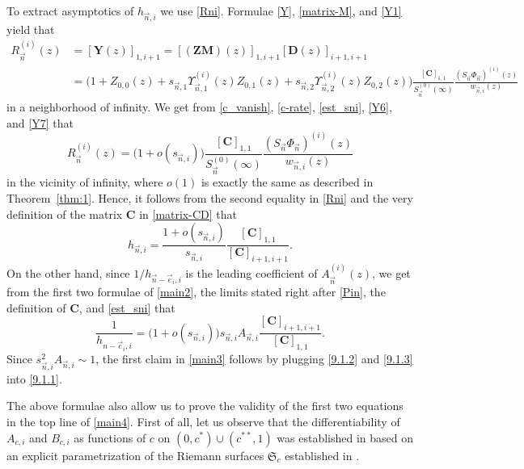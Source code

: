 \documentclass[10pt,a4paper]{amsart}
\numberwithin{equation}{section}
\newcommand{\n}{{\vec n}}
\newcommand{\RS}{\boldsymbol{\mathfrak{S}}}
\begin{document}
To extract asymptotics of $ h_{\n,i} $ we use \eqref{Rni}. Formulae \eqref{Y}, \eqref{matrix-M}, and \eqref{Y1} yield that
\begin{align*}
R_\n^{(i)}(z) &= [\boldsymbol Y(z)]_{1,i+1} =[(\boldsymbol{ZM})(z)]_{1,i+1}[\boldsymbol D(z)]_{i+1,i+1} \\
& = \bigl( 1+ Z_{0,0}(z) + s_{\n,1}\Upsilon_{\n,1}^{(i)}(z)Z_{0,1}(z) + s_{\n,2}\Upsilon_{\n,2}^{(i)}(z)Z_{0,2}(z) \bigr) \frac{ [\boldsymbol C]_{1,1}}{S_\n^{(0)}(\infty)} \frac{(S_\n\Phi_\n)^{(i)}(z)}{w_{\n,i}(z) }
\end{align*}
in a neighborhood of infinity. We get from \eqref{c_vanish}, \eqref{c-rate}, \eqref{est_sni}, \eqref{Y6}, and \eqref{Y7} that
\[
R_\n^{(i)}(z) = \bigl( 1 + o(s_{\n,i}) \bigr) \frac{ [\boldsymbol C]_{1,1}}{S_\n^{(0)}(\infty)} \frac{(S_\n\Phi_\n)^{(i)}(z)}{w_{\n,i}(z) }
\]
in the vicinity of infinity, where $ o(1) $ is exactly the same as described in Theorem~\ref{thm:1}. Hence, it follows from the second equality in \eqref{Rni} and the very definition of the matrix $ \boldsymbol C $ in \eqref{matrix-CD} that
\begin{equation}
\label{9.1.2}
h_{\n,i} = \frac{1 + o(s_{\n,i})}{s_{\n,i}} \frac{[\boldsymbol C]_{1,1}}{[\boldsymbol C]_{i+1,i+1}}.
\end{equation}
On the other hand, since $ 1/h_{\n-\vec e_i,i} $ is the leading coefficient of $ A_\n^{(i)}(z) $, we get from the first two formulae of \eqref{main2}, the limits stated right after \eqref{Pin}, the definition of $ \boldsymbol C $, and \eqref{est_sni} that
\begin{equation}
\label{9.1.3}
\frac1{h_{n-\vec e_i,i}} = \bigl( 1 + o(s_{\n,i}) \bigr) s_{\n,i}A_{\n,i} \frac{[\boldsymbol C]_{i+1,i+1}}{[\boldsymbol C]_{1,1}}.
\end{equation}
Since $ s_{\n,i}^2A_{\n,i} \sim 1$, the first claim in \eqref{main3} follows by plugging \eqref{9.1.2} and \eqref{9.1.3} into \eqref{9.1.1}.

The above formulae also allow us to prove the validity of the first two equations in the top line of \eqref{main4}. First of all, let us observe that the differentiability of $ A_{c,i} $ and $ B_{c,i} $ as functions of $ c $ on $ (0,c^*) \cup (c^{**},1) $ was established in \cite[Section~4]{ApKoz20} based on an explicit parametrization of the Riemann surfaces $ \RS_c $ established in \cite{ApKalLysTul09,LysTul17,LysTul18}.
\end{document}
